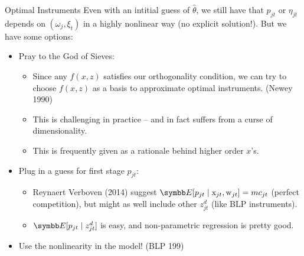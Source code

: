 \documentclass[aspectratio=169,10pt]{beamer}
\begin{document}
\begin{frame}{Optimal Instruments}
Even with an intitial guess of $\widehat{\theta}$, we still have that $p_{jt}$ or $\eta_{jt}$ depends on $(\omega_{j},\xi_{t})$ in a highly nonlinear way (no explicit solution!). But we have some options:
\begin{itemize}
\item Pray to the God of Sieves:
\begin{itemize}
\item Since any $f(x,z)$ satisfies our orthogonality condition, we can try to choose $f(x,z)$ as a \alert{basis} to approximate optimal instruments. (Newey 1990)
\item This is challenging in practice -- and in fact suffers from a curse of dimensionality.
\item This is frequently given as a rationale behind higher order $x$'s.
\end{itemize}
\item Plug in a guess for \alert{first stage} $p_{jt}$:
\begin{itemize}
\item Reynaert Verboven (2014) suggest $\E[p_{jt} \mid \mathrm{x}_{jt}, \mathrm{w}_{jt}]=mc_{jt}$ (perfect competition), but might as well include other $z_{jt}^d$ (like BLP instruments).
\item $\E[p_{jt} \mid z_{jt}^d]$ is easy, and non-parametric regression is pretty good.
\end{itemize}
\item Use the nonlinearity in the model! (BLP 199)
\end{itemize}
\end{frame}



\end{document}
